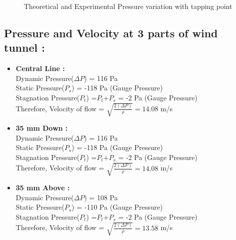 \documentclass[12pt,a4paper]{article}
\begin{document}
\begin{figure}[!ht]
	\begin{center}
	\end{center}
	\caption{Theoretical and Experimental Pressure variation with tapping point}
\end{figure}

\newpage

\subsection{Pressure and Velocity at 3 parts of wind tunnel :}

\begin{itemize}
    \item \textbf{Central Line :}\\
    Dynamic Pressure($\Delta P$) = 116 Pa \\
    Static Pressure($P_s$) = -118 Pa (Gauge Pressure) \\
    Stagnation Pressure($P_t$) =$P_t$+$P_s$ = -2 Pa (Gauge Pressure)\\
    Therefore, Velocity of flow = $\sqrt{\frac{2 (\Delta P)}{\rho}} = 14.08 $ m/s
    
    \item \textbf{35 mm Down :}\\
    Dynamic Pressure($\Delta P$) = 116 Pa \\
    Static Pressure($P_s$) = -118 Pa (Gauge Pressure) \\
    Stagnation Pressure($P_t$) =$P_t$+$P_s$ = -2 Pa (Gauge Pressure)\\
    Therefore, Velocity of flow = $\sqrt{\frac{2 (\Delta P)}{\rho}} = 14.08$ m/s
    \item \textbf{35 mm Above :}\\
    Dynamic Pressure($\Delta P$) = 108 Pa \\
    Static Pressure($P_s$) = -110 Pa (Gauge Pressure) \\
    Stagnation Pressure($P_t$) =$P_t$+$P_s$ = -2 Pa (Gauge Pressure)\\
    Therefore, Velocity of flow = $\sqrt{\frac{2 (\Delta P)}{\rho}} = 13.58 $ m/s
    
\end{itemize}
\end{document}
